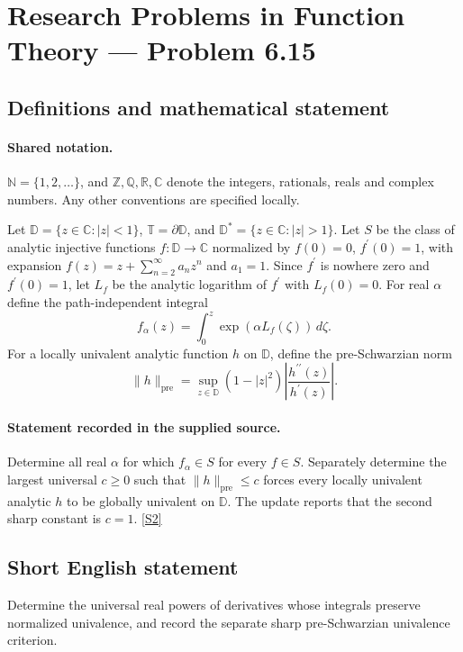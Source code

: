 \documentclass[11pt]{book}
\newcommand{\sref}[2]{\hyperlink{source:#1:#2}{[S#2]}}
\begin{document}
\section{Research Problems in Function Theory — Problem 6.15}\label{statement}

\subsection{Definitions and mathematical statement}

\paragraph{Shared notation.}$\mathbb N=\{1,2,\ldots\}$, and $\mathbb Z,\mathbb Q,\mathbb R,\mathbb C$ denote the integers, rationals, reals and complex numbers. Any other conventions are specified locally.


Let $\mathbb D=\{z\in\mathbb C:|z|<1\}$, $\mathbb T=\partial\mathbb D$, and $\mathbb D^*=\{z\in\mathbb C:|z|>1\}$. Let $S$ be the class of analytic injective functions $f:\mathbb D\to\mathbb C$ normalized by $f(0)=0$, $f^{\prime}(0)=1$, with expansion $f(z)=z+\sum_{n=2}^{\infty}a_nz^n$ and $a_1=1$. Since $f^{\prime}$ is nowhere zero and $f^{\prime}(0)=1$, let $L_f$ be the analytic logarithm of $f^{\prime}$ with $L_f(0)=0$. For real $\alpha$ define the path-independent integral \[f_\alpha(z)=\int_0^z\exp(\alpha L_f(\zeta))\,d\zeta.\] For a locally univalent analytic function $h$ on $\mathbb D$, define the pre-Schwarzian norm \[\|h\|_{\mathrm{pre}}=\sup_{z\in\mathbb D}(1-|z|^2)\left|\frac{h^{\prime\prime}(z)}{h^{\prime}(z)}\right|.\]
\paragraph{Statement recorded in the supplied source.}
Determine all real $\alpha$ for which $f_\alpha\in S$ for every $f\in S$. Separately determine the largest universal $c\ge0$ such that $\|h\|_{\mathrm{pre}}\le c$ forces every locally univalent analytic $h$ to be globally univalent on $\mathbb D$. The update reports that the second sharp constant is $c=1$. \sref{statement}{2}
\subsection{Short English statement}
Determine the universal real powers of derivatives whose integrals preserve normalized univalence, and record the separate sharp pre-Schwarzian univalence criterion.
\end{document}
